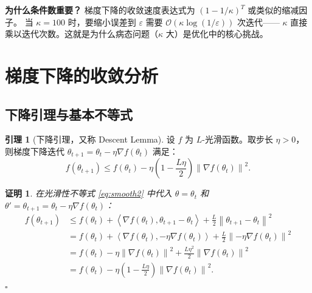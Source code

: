 \documentclass[12pt,a4paper]{ctexart}
\theoremstyle{definition}
\newtheorem{lemma}[theorem]{引理}
\theoremstyle{plain}
\newtheorem*{proof*}{证明}
\newcommand{\eps}{\varepsilon}
\newcommand{\grad}{\nabla}
\newcommand{\norm}[1]{\left\lVert #1 \right\rVert}
\newcommand{\ip}[2]{\left\langle #1,#2 \right\rangle}
\begin{document}
\textbf{为什么条件数重要？} 梯度下降的收敛速度表达式为 $(1 - 1/\kappa)^T$ 或类似的缩减因子。
当 $\kappa = 100$ 时，要缩小误差到 $\eps$ 需要 $\mathcal{O}(\kappa \log(1/\eps))$ 次迭代——
$\kappa$ 直接乘以迭代次数。这就是为什么病态问题（$\kappa$ 大）是优化中的核心挑战。

\section{梯度下降的收敛分析}

\subsection{下降引理与基本不等式}

\begin{lemma}[下降引理，又称 Descent Lemma]\label{lem:descent}
  设 $f$ 为 $L$-光滑函数。取步长 $\eta > 0$，则梯度下降迭代
  $\theta_{t+1} = \theta_t - \eta \grad f(\theta_t)$ 满足：
  \begin{equation}\label{eq:descent}
    f(\theta_{t+1}) \le f(\theta_t) - \eta\left(1 - \frac{L\eta}{2}\right) \norm{\grad f(\theta_t)}^2.
  \end{equation}
\end{lemma}

\begin{proof*}
  在光滑性不等式 \eqref{eq:smooth2} 中代入 $\theta = \theta_t$ 和 $\theta' = \theta_{t+1} = \theta_t - \eta \grad f(\theta_t)$：
  \begin{equation}
    \begin{aligned}
      f(\theta_{t+1})
      &\le f(\theta_t) + \ip{\grad f(\theta_t)}{\theta_{t+1} - \theta_t}
        + \frac{L}{2} \norm{\theta_{t+1} - \theta_t}^2 \\[4pt]
      &= f(\theta_t) + \ip{\grad f(\theta_t)}{-\eta \grad f(\theta_t)}
        + \frac{L}{2} \norm{-\eta \grad f(\theta_t)}^2 \\[4pt]
      &= f(\theta_t) - \eta \norm{\grad f(\theta_t)}^2 + \frac{L\eta^2}{2} \norm{\grad f(\theta_t)}^2 \\[4pt]
      &= f(\theta_t) - \eta\left(1 - \frac{L\eta}{2}\right) \norm{\grad f(\theta_t)}^2.
    \end{aligned}
  \end{equation}
  $\square$
\end{proof*}
\end{document}
